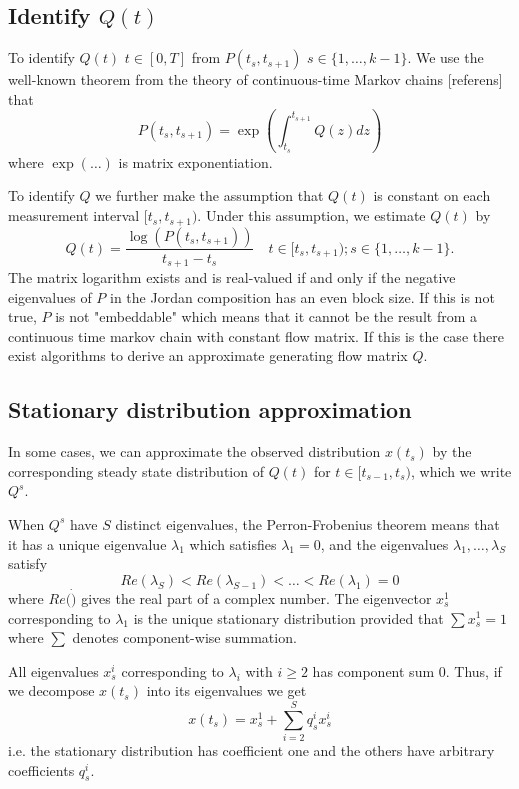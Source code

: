 \subsection{Identify $Q(t)$}
To identify $Q(t)$ $t\in[0,T]$ from $P(t_s,t_{s+1})$ $s\in\{1,\dots,k-1\}$. We use the well-known theorem from the theory of continuous-time Markov chains [referens] that
\[
P(t_s,t_{s+1})=\exp\left(\int_{t_s}^{t_{s+1}} Q(z)dz\right)
\]
where $\exp\left(\dots\right)$ is matrix exponentiation. 

To identify $Q$ we further make the assumption that $Q(t)$ is constant on each measurement interval $[t_s,t_{s+1})$. Under this assumption, we estimate $Q(t)$ by
\[
Q(t)=\frac{\log(P(t_s,t_{s+1}))}{t_{s+1}-t_s} \quad t\in[t_s,t_{s+1}); s\in\{1,\dots,k-1\}.
\]
The matrix logarithm exists and is real-valued if and only if the negative eigenvalues of $P$ in the Jordan composition has an even block size. If this is not true, $P$ is not "embeddable" which means that it cannot be the result from a continuous time markov chain with constant flow matrix. If this is the case there exist algorithms to derive an approximate generating flow matrix $Q$.

\subsection{Stationary distribution approximation}
In some cases, we can approximate the observed distribution $x(t_s)$ by the corresponding steady state distribution of $Q(t)$ for $t\in[t_{s-1},t_s)$, which we write $Q^s$.

When $Q^s$ have $S$ distinct eigenvalues, the Perron-Frobenius theorem means that it has a unique eigenvalue $\lambda_1$ which satisfies $\lambda_1=0$, and the eigenvalues $\lambda_1,\dots,\lambda_S$ satisfy
\[
Re(\lambda_S)<Re(\lambda_{S-1})<\dots < Re(\lambda_1)=0
\]
where $Re(\dot)$ gives the real part of a complex number. The eigenvector $x_s^1$ corresponding to $\lambda_1$ is the unique stationary distribution provided that $\sum x_s^1=1$ where $\sum$ denotes component-wise summation.

All eigenvalues $x_s^i$ corresponding to $\lambda_i$ with $i\ge 2$ has component sum $0$. Thus, if we decompose $x(t_s)$ into its eigenvalues we get
\[
x(t_s)=x_s^1 + \sum_{i=2}^S q^i_s x_s^i
\]
i.e. the stationary distribution has coefficient one and the others have arbitrary coefficients $q^i_s$. 

